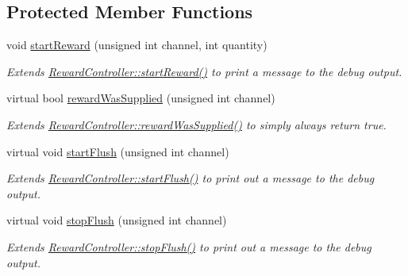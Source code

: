\subsection*{Protected Member Functions}
\begin{DoxyCompactItemize}
\item 
\hypertarget{class_picto_1_1_null_reward_controller_a1aa333e20908b5e6e79cdc7465617c4e}{void \hyperlink{class_picto_1_1_null_reward_controller_a1aa333e20908b5e6e79cdc7465617c4e}{start\-Reward} (unsigned int channel, int quantity)}\label{class_picto_1_1_null_reward_controller_a1aa333e20908b5e6e79cdc7465617c4e}

\begin{DoxyCompactList}\small\item\em Extends \hyperlink{class_picto_1_1_reward_controller_a3e09bdba141632e89472bef42dc1e132}{Reward\-Controller\-::start\-Reward()} to print a message to the debug output. \end{DoxyCompactList}\item 
\hypertarget{class_picto_1_1_null_reward_controller_a4675f2eeae24a5473e49bb8b6df99b38}{virtual bool \hyperlink{class_picto_1_1_null_reward_controller_a4675f2eeae24a5473e49bb8b6df99b38}{reward\-Was\-Supplied} (unsigned int channel)}\label{class_picto_1_1_null_reward_controller_a4675f2eeae24a5473e49bb8b6df99b38}

\begin{DoxyCompactList}\small\item\em Extends \hyperlink{class_picto_1_1_reward_controller_a213ce91b8ef9019786e96e601d9641b9}{Reward\-Controller\-::reward\-Was\-Supplied()} to simply always return true. \end{DoxyCompactList}\item 
\hypertarget{class_picto_1_1_null_reward_controller_a085d54f89d532445f4a66a179a029220}{virtual void \hyperlink{class_picto_1_1_null_reward_controller_a085d54f89d532445f4a66a179a029220}{start\-Flush} (unsigned int channel)}\label{class_picto_1_1_null_reward_controller_a085d54f89d532445f4a66a179a029220}

\begin{DoxyCompactList}\small\item\em Extends \hyperlink{class_picto_1_1_reward_controller_aaf880507edaa44288cd5b17bdb71f079}{Reward\-Controller\-::start\-Flush()} to print out a message to the debug output. \end{DoxyCompactList}\item 
\hypertarget{class_picto_1_1_null_reward_controller_af824bf42bec797ee970b5efca37cc0a9}{virtual void \hyperlink{class_picto_1_1_null_reward_controller_af824bf42bec797ee970b5efca37cc0a9}{stop\-Flush} (unsigned int channel)}\label{class_picto_1_1_null_reward_controller_af824bf42bec797ee970b5efca37cc0a9}

\begin{DoxyCompactList}\small\item\em Extends \hyperlink{class_picto_1_1_reward_controller_a5a14b4f103def1711b485cc05f4c53bb}{Reward\-Controller\-::stop\-Flush()} to print out a message to the debug output. \end{DoxyCompactList}\end{DoxyCompactItemize}
